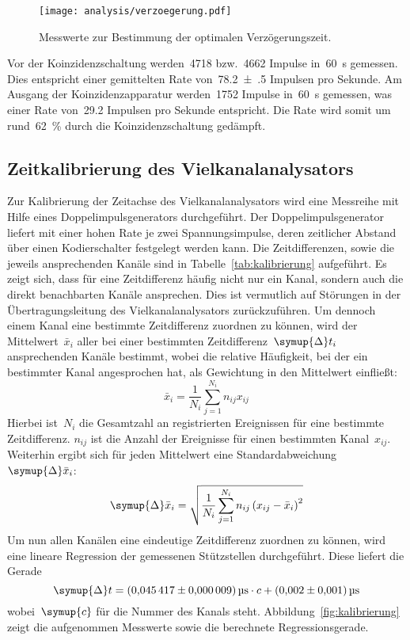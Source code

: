 \begin{figure}[htb]
  \centering
  \texttt{[image: analysis/verzoegerung.pdf]}
  \caption{Messwerte zur Bestimmung der optimalen Verzögerungszeit.}
  \label{fig:verzoegerung}
\end{figure}

Vor der Koinzidenzschaltung werden~\num{4718} bzw.~\num{4662} Impulse
in~\SI{60}{\second} gemessen. Dies entspricht einer gemittelten Rate
von~\num{78.2(5)} Impulsen pro Sekunde. Am Ausgang der Koinzidenzapparatur
werden~\num{1752} Impulse in~\SI{60}{\second} gemessen, was einer Rate
von~\num{29.2} Impulsen pro Sekunde entspricht. Die Rate wird somit um
rund~\SI{62}{\percent} durch die Koinzidenzschaltung gedämpft.

\subsection{Zeitkalibrierung des Vielkanalanalysators}

Zur Kalibrierung der Zeitachse des Vielkanalanalysators wird eine Messreihe mit
Hilfe eines Doppelimpulsgenerators durchgeführt. Der Doppelimpulsgenerator
liefert mit einer hohen Rate je zwei Spannungsimpulse, deren zeitlicher Abstand
über einen Kodierschalter festgelegt werden kann. Die Zeitdifferenzen, sowie die
jeweils ansprechenden Kanäle sind in Tabelle~\ref{tab:kalibrierung} aufgeführt.
Es zeigt sich, dass für eine Zeitdifferenz häufig nicht nur ein Kanal, sondern
auch die direkt benachbarten Kanäle ansprechen. Dies ist vermutlich auf
Störungen in der Übertragungsleitung des Vielkanalanalysators zurückzuführen.
Um dennoch einem Kanal eine bestimmte Zeitdifferenz zuordnen zu können, wird der
Mittelwert~$\bar{x}_i$ aller bei einer bestimmten
Zeitdifferenz~$\symup{\Delta}t_i$ ansprechenden Kanäle bestimmt, wobei die
relative Häufigkeit, bei der ein bestimmter Kanal angesprochen hat, als
Gewichtung in den Mittelwert einfließt:
%
\begin{equation}
  \bar{x}_i=\frac{1}{N_i}\sum_{j=1}^{N_i}n_{ij}x_{ij}
  \label{eq:kanal_mittelwert}
\end{equation}
%
Hierbei ist~$N_i$ die Gesamtzahl an registrierten Ereignissen für eine bestimmte
Zeitdifferenz. $n_{ij}$ ist die Anzahl der Ereignisse für einen bestimmten
Kanal~$x_{ij}$. Weiterhin ergibt sich für jeden Mittelwert eine
Standardabweichung~$\symup{\Delta}\bar{x}_i$:
%
\begin{equation}
  \symup{\Delta}\bar{x}_i=\sqrt{\frac{1}{N_i}\sum_{j=1}^{N_i}n_{ij}\left(x_{ij}-\bar{x}_i\right)^2}
  \label{eq:kanal_standardabweichung}
\end{equation}
%
Um nun allen Kanälen eine eindeutige Zeitdifferenz zuordnen zu können, wird eine
lineare Regression der gemessenen Stützstellen durchgeführt. Diese liefert die
Gerade
%
\begin{equation}
  \symup{\Delta}t=\SI{0.045417(9)}{\micro\second}\cdot c+\SI{0.002(1)}{\micro\second}
  \label{eq:kalibrierung}
\end{equation}
%
wobei~$\symup{c}$ für die Nummer des Kanals steht.
Abbildung~\ref{fig:kalibrierung} zeigt die aufgenommen Messwerte sowie die
berechnete Regressionsgerade.

